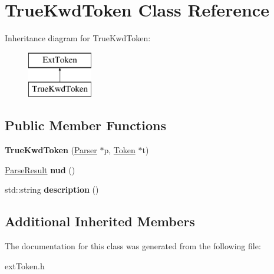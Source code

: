 \hypertarget{class_true_kwd_token}{}\section{True\+Kwd\+Token Class Reference}
\label{class_true_kwd_token}
Inheritance diagram for True\+Kwd\+Token\+:\begin{figure}[H]
\begin{center}
\leavevmode
\includegraphics[height=2.000000cm]{class_true_kwd_token}
\end{center}
\end{figure}
\subsection*{Public Member Functions}
\begin{DoxyCompactItemize}
\item 
\hypertarget{class_true_kwd_token_aec070f83a6b91ed35a41e24dfd301b17}{}{\bfseries True\+Kwd\+Token} (\hyperlink{class_parser}{Parser} $\ast$p, \hyperlink{class_token}{Token} $\ast$t)\label{class_true_kwd_token_aec070f83a6b91ed35a41e24dfd301b17}

\item 
\hypertarget{class_true_kwd_token_ad86f05acb9483438db153eab44aa6dac}{}\hyperlink{class_parse_result}{Parse\+Result} {\bfseries nud} ()\label{class_true_kwd_token_ad86f05acb9483438db153eab44aa6dac}

\item 
\hypertarget{class_true_kwd_token_af4dbe740f06e6928a436d06349af67a9}{}std\+::string {\bfseries description} ()\label{class_true_kwd_token_af4dbe740f06e6928a436d06349af67a9}

\end{DoxyCompactItemize}
\subsection*{Additional Inherited Members}


The documentation for this class was generated from the following file\+:\begin{DoxyCompactItemize}
\item 
ext\+Token.\+h\end{DoxyCompactItemize}
